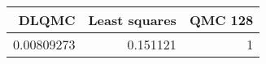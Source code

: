 \begin{tabular}{rrr}
\toprule
      DLQMC &   Least squares &   QMC 128 \\
\midrule
 0.00809273 &        0.151121 &         1 \\
\bottomrule
\end{tabular}
